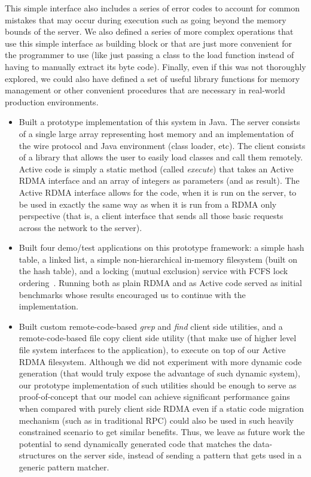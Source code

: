 \documentclass[10pt]{article}
\begin{document}
  This simple interface also includes a series of error codes to account for common mistakes that may occur during execution such as going beyond the memory bounds of the server. We also defined a series of more complex operations that use this simple interface as building block or that are just more convenient for the programmer to use (like just passing a class to the load function instead of having to manually extract its byte code). 
Finally, even if this was not thoroughly explored, we could also have defined a set of useful library functions for memory management or other convenient procedures that are necessary in real-world production environments.
  
  \begin{itemize}
\item Built a prototype implementation of this system in Java. The
  server consists of a single large array representing host memory and
  an implementation of the wire protocol and Java environment (class
  loader, etc). The client consists of a library that allows the user
  to easily load classes and call them remotely. Active code is simply a static method (called 
  \textit{execute}) that takes an Active RDMA interface and an array of integers as parameters (and as result). The Active RDMA interface allows for the code, when it is run on the server, to be used in exactly the same way as when it is run from a RDMA only perspective (that is, a client interface that sends all those basic requests across the network to the server). 


\item Built four demo/test applications on this prototype framework: a
  simple hash table, a linked list, a simple non-hierarchical
  in-memory filesystem (built on the hash table), and a locking
  (mutual exclusion) service with FCFS lock
  ordering~\cite{nic-basedatomic}. Running both as plain RDMA and as Active code served as initial benchmarks whose results encouraged us to continue with the implementation. 


\item Built custom remote-code-based \emph{grep} and \emph{find}
  client side utilities, and a remote-code-based file copy client side
  utility (that make use of higher level file system interfaces to the
  application), to execute on top of our Active RDMA filesystem. Although we did not experiment with more dynamic code generation (that would truly expose the advantage of such dynamic system), our prototype implementation of such utilities should be enough to serve as proof-of-concept that our model can achieve significant performance gains when compared with purely client side RDMA even if a static code migration mechanism (such as in traditional RPC) could also be used in such heavily constrained scenario to get similar benefits. Thus, we leave as future work the potential to send dynamically generated code that matches the data-structures on the server side, instead of sending a pattern that gets used in a generic pattern matcher. 

\end{itemize}
\end{document}
